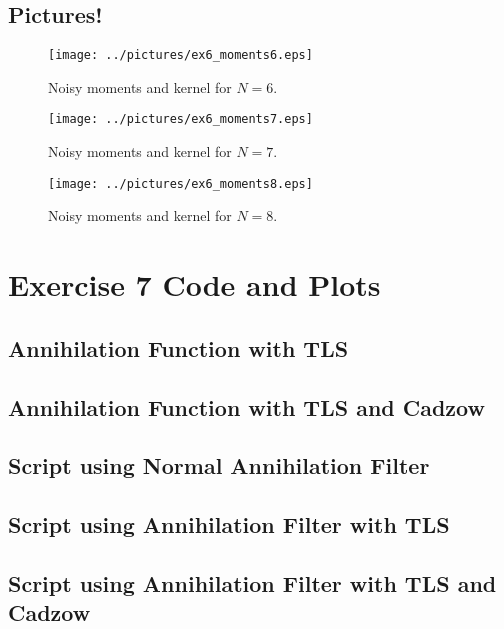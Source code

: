 \documentclass[11pt,a4paper]{report}
\begin{document}
\subsection{Pictures!}

\begin{figure}[!ht]
    \centering
    \texttt{[image: ../pictures/ex6\_moments6.eps]}
    \caption{Noisy moments and kernel for $N = 6$.}
\end{figure}

\begin{figure}[!ht]
    \centering
    \texttt{[image: ../pictures/ex6\_moments7.eps]}
    \caption{Noisy moments and kernel for $N = 7$.}
\end{figure}

\begin{figure}[!ht]
    \centering
    \texttt{[image: ../pictures/ex6\_moments8.eps]}
    \caption{Noisy moments and kernel for $N = 8$.}
\end{figure}

\section{Exercise 7 Code and Plots}
\subsection{Annihilation Function with TLS}

\newpage

\subsection{Annihilation Function with TLS and Cadzow}

\newpage

\subsection{Script using Normal Annihilation Filter}

\newpage

\subsection{Script using Annihilation Filter with TLS}

\newpage

\subsection{Script using Annihilation Filter with TLS and Cadzow}

\newpage
\end{document}
